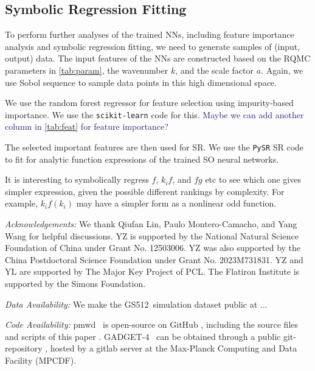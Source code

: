 \documentclass[modern, trackchanges, dvipsnames]{aastex631}
\newcommand{\pmwd}{{\usefont{T1}{nova}{m}{sl}pmwd}}
\newcommand{\GADGET}{{{\fontsize{10pt}{12pt}\selectfont GADGET}-4}}
\newcommand{\GSDATA}{{GS512}}
\newcommand{\YL}[1]{\textcolor{Bittersweet}{#1}}
\newcommand{\YZ}[1]{\textcolor{MidnightBlue}{#1}}
\begin{document}
\vspace{1em}
\subsection{Symbolic Regression Fitting}

To perform further analyses of the trained NNs, including feature
importance analysis and symbolic regression fitting, we need to generate
samples of (input, output) data.
The input features of the NNs are constructed based on the RQMC
parameters in \autoref{tab:param}, the wavenumber $k$, and the scale
factor $a$.
Again, we use Sobol sequence to sample data points in this high
dimensional space.

We use the random forest regressor for feature selection using
impurity-based importance.
We use the \texttt{scikit-learn} \citep{scikit-learn} code for this.
\YZ{Maybe we can add another column in \autoref{tab:feat} for feature
importance?}

The selected important features are then used for SR.
We use the \texttt{PySR} \citep{PySR} SR code to fit for analytic
function expressions of the trained SO neural networks.

\YL{It is interesting to symbolically regress $f$, $k_i f$, and $f g$
etc to see which one gives simpler expression, given the possible
different rankings by complexity.
For example, $k_i f(k_i)$ may have a simpler form as a nonlinear odd
function.}


\vspace{1em}
\textit{\large Acknowledgements:}
We thank Qiufan Lin, Paulo Montero-Camacho, and Yang Wang for helpful
discussions.
YZ is supported by the National Natural Science Foundation of China
under Grant No. 12503006.
YZ was also supported by the China Postdoctoral Science Foundation under
Grant No. 2023M731831.
YZ and YL are supported by The Major Key Project of PCL.
The Flatiron Institute is supported by the Simons Foundation.


\vspace{1em}
\textit{\large Data Availability:}
We make the \GSDATA\ simulation dataset public at ...


\vspace{1em}
\textit{\large Code Availability:}
\pmwd\ \citep{Li2022b} is open-source on GitHub
\href{https://github.com/eelregit/pmwd}{\faGithub}, including the source
files and scripts of this paper
\href{https://github.com/eelregit/pmwd/tree/master/docs/papers/sto}{\faFile}.
\GADGET\ \citep{GADGET-4} can be obtained through a public
git-repository \href{http://gitlab.mpcdf.mpg.de/vrs/gadget4}{\faGitlab},
hosted by a gitlab server at the Max-Planck Computing and Data Facility
(MPCDF).
\end{document}
